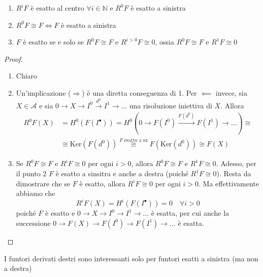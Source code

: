 \begin{corollary}{}
\begin{enumerate}[label = \arabic*.]
    \item \(R^{i}F\) è esatto al centro \(\forall i \in \mathbb{N}\) e \(R^{0}F\)
        è esatto a sinistra
    \item \(R^{0}F \cong F \iff F\) è esatto a sinistra 
    \item \(F\) è esatto se e solo se \(R^{0}F \cong F\) e \(R^{i > 0}F \cong 0\),
        ossia \(R^{0}F \cong F\) e \(R^{1}F \cong 0\) 
\end{enumerate}
\end{corollary}

\begin{proof}{}
\begin{enumerate}[label = \arabic*.]
    \item Chiaro
    \item Un'implicazione (\(\Rightarrow\)) è una diretta conseguenza di 1. Per
        \(\impliedby \) invece, sia \(X \in \mathcal{A}\) e sia \(0 \to X \to
        I^{0} \overset{d^{0}}{\to} I^{1} \to  \dots\) una risoluzione iniettiva
        di \(X\). Allora
        \begin{align*}
            R^{0}F{(X)} &= H^{0}{(F{(I^{\bullet})})} = H^{0}{(0 \to F{(I^{0})}
            \overset{F{(d^{0})}}{\to} F{(I^{1})} \to \dots)} \cong \\ &\cong
          \mathrm{Ker}{(F{(d^{0})})} \overset{\text{\(F\) esatto a sx}}{\cong}
          F{(\mathrm{Ker}{(d^{0})})} \cong F{(X)}
        \end{align*}
    \item Se \(R^{0}F \cong F\) e \(R^{i}F \cong 0\) per ogni \(i > 0\), allora
        \(R^{0}F \cong F\) e \(R^{1} F \cong 0\). Adesso, per il punto 2 \(F\) è
        esatto a sinsitra e anche a destra (poiché \(R^{1}F \cong 0\)). Resta da
        dimostrare che se \(F\) è esatto, allora \(R^{i}F \cong 0\) per ogni \(i
        > 0\). Ma effettivamente abbiamo che
        \[
          R^{i}F{(X)} = H^{i}{(F{(I^\bullet)})} = 0 \quad \forall i > 0
        \]
        poiché \(F\) è esatto e \(0 \to X \to I^{0} \to I^{1} \to \dots\) è
        esatta, per cui anche la successione \(0 \to F{(X)} \to F{(I^{0})} \to F{(I^{1})} \to
        \dots\) è esatta.
\end{enumerate}
\end{proof}
\begin{remark}{}
    I funtori derivati destri sono interessanti solo per funtori esatti a
    sinistra (ma non a destra)
\end{remark}


